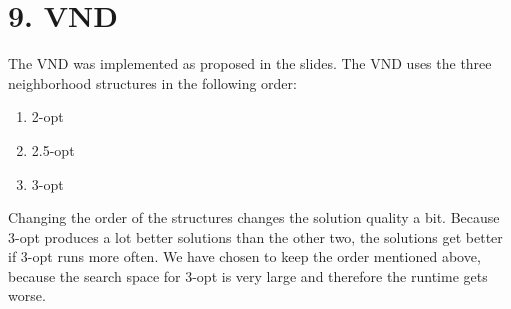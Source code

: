 \section*{9. VND}
The VND was implemented as proposed in the slides. The VND uses the three neighborhood structures in the following order:
\begin{enumerate}
  \item 2-opt
  \item 2.5-opt
  \item 3-opt
\end{enumerate}
Changing the order of the structures changes the solution quality a bit. Because 3-opt produces a lot better solutions than the other two, the solutions get better if 3-opt runs more often. We have chosen to keep the order mentioned above, because the search space for 3-opt is very large and therefore the runtime gets worse.

